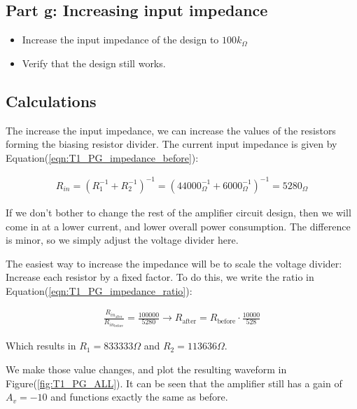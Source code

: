 \documentclass[11pt]{article}
\begin{document}
	\subsection{Part g: Increasing input impedance}
	\begin{itemize}
		\item Increase the input impedance of the design to $100k_\Omega$
		\item Verify that the design still works.
	\end{itemize}

	\subsection{Calculations}
		The increase the input impedance, we can increase the values of the resistors forming the biasing resistor divider. The current input impedance is given by Equation(\ref{eqn:T1_PG_impedance_before}):
		
		\begin{align}\label{eqn:T1_PG_impedance_before} R_{in} = (R_1^{-1} + R_2^{-1})^{-1} = (44000_\Omega^{-1} + 6000_\Omega^{-1})^{-1} = 5280_\Omega \end{align}
		
		If we don't bother to change the rest of the amplifier circuit design, then we will come in at a lower current, and lower overall power consumption. The difference is minor, so we simply adjust the voltage divider here. 
		
		The easiest way to increase the impedance will be to scale the voltage divider: Increase each resistor by a fixed factor. To do this, we write the ratio in Equation(\ref{eqn:T1_PG_impedance_ratio}):
		
		\begin{align}\label{eqn:T1_PG_impedance_ratio} 
			\frac{R_{in_{\text{after}}}}{R_{in_{\text{before}}}} = \frac{100000}{5280} \rightarrow R_{\text{after}} = R_{\text{before}}\cdot \frac{10000}{528}
		\end{align}
		
		Which results in $R_1 = 833333\Omega$ and $R_2 = 113636\Omega$.
		
		We make those value changes, and plot the resulting waveform in Figure(\ref{fig:T1_PG_ALL}). It can be seen that the amplifier still has a gain of $A_v = -10$ and functions exactly the same as before.
		
\end{document}
